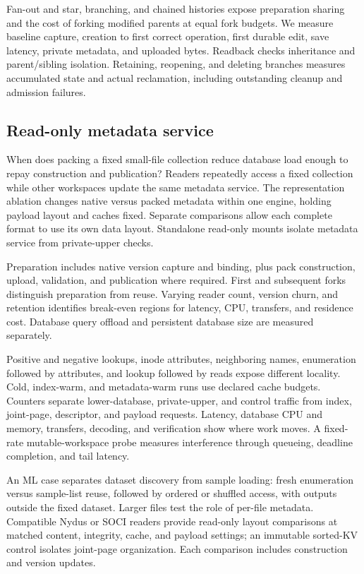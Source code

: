 Fan-out and star, branching, and chained histories expose preparation
sharing and the cost of forking modified parents at equal fork budgets.
We measure baseline capture, creation to first correct operation, first
durable edit, save latency, private metadata, and uploaded bytes.
Readback checks inheritance and parent/sibling isolation. Retaining,
reopening, and deleting branches measures accumulated state and actual
reclamation, including outstanding cleanup and admission failures.

\subsection{Read-only metadata service}

 When does packing a fixed small-file collection reduce
database load enough to repay construction and publication?
Readers repeatedly access a fixed collection while other workspaces
update the same metadata service. The representation ablation changes
native versus packed metadata within one engine, holding payload layout
and caches fixed. Separate comparisons allow each complete format to
use its own data layout. Standalone read-only mounts isolate metadata
service from private-upper checks.

Preparation includes native version capture and binding, plus pack
construction, upload, validation, and publication where required.
First and subsequent forks distinguish preparation from reuse. Varying
reader count, version churn, and retention identifies break-even regions
for latency, CPU, transfers, and residence cost. Database query offload
and persistent database size are measured separately.

Positive and negative lookups, inode attributes, neighboring names,
enumeration followed by attributes, and lookup followed by reads expose
different locality. Cold, index-warm, and metadata-warm runs use declared
cache budgets. Counters separate lower-database, private-upper, and
control traffic from index, joint-page, descriptor, and payload requests.
Latency, database CPU and memory, transfers, decoding, and verification
show where work moves. A fixed-rate mutable-workspace probe measures
interference through queueing, deadline completion, and tail latency.

An ML case separates dataset discovery from sample loading: fresh
enumeration versus sample-list reuse, followed by ordered or shuffled
access, with outputs outside the fixed dataset. Larger files test the
role of per-file metadata. Compatible Nydus or SOCI readers provide
read-only layout comparisons at matched content, integrity, cache,
and payload settings; an immutable sorted-KV control isolates joint-page
organization. Each comparison includes construction and version updates.

